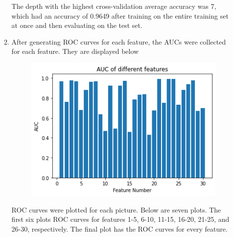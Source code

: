 \documentclass{article}
\begin{document}
\begin{enumerate}
\begin{enumerate}
	The depth with the highest cross-validation average accuracy was 7, which had an accuracy of 0.9649 after training on the entire training set at once and then evaluating on the test set.
	
	\item After generating ROC curves for each feature, the AUCs were collected for each feature. They are displayed below
	\begin{figure}[H]
		\centering
		\includegraphics[scale=0.5]{img/aucs.png}
	\end{figure}
	ROC curves were plotted for each picture. Below are seven plots. The first six plots ROC curves for features 1-5, 6-10, 11-15, 16-20, 21-25, and 26-30, respectively. The final plot has the ROC curves for every feature.


\end{enumerate}
\end{enumerate}
\end{document}
